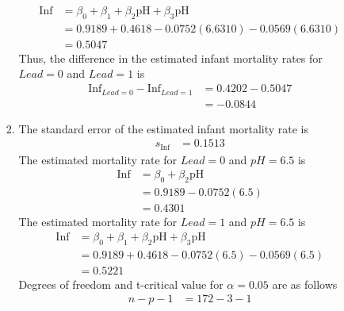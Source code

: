 \documentclass{uofa-eng-assignment}
\begin{document}
\begin{enumerate}
\begin{enumerate}
\begin{enumerate}
\begin{align*}
                              \text{Inf} & = \beta_0 + \beta_1 + \beta_2\text{pH} + \beta_3\text{pH} \\
                                         & = 0.9189 + 0.4618 - 0.0752(6.6310) - 0.0569(6.6310)       \\
                                         & = 0.5047
                          \end{align*}
                          Thus, the difference in the estimated infant mortality rates for $Lead = 0$ and $Lead = 1$ is
                          \begin{align*}
                              \text{Inf}_{Lead = 0} - \text{Inf}_{Lead = 1} & = 0.4202 - 0.5047 \\
                                                                            & = -0.0844
                          \end{align*}
                    \item
                          The standard error of the estimated infant mortality rate is
                          \begin{align*}
                              s_{\text{Inf}} & = 0.1513
                          \end{align*}
                          The estimated mortality rate for $Lead = 0$ and $pH = 6.5$ is
                          \begin{align*}
                              \text{Inf} & = \beta_0 + \beta_2\text{pH} \\
                                         & = 0.9189 - 0.0752(6.5)       \\
                                         & = 0.4301
                          \end{align*}
                          The estimated mortality rate for $Lead = 1$ and $pH = 6.5$ is
                          \begin{align*}
                              \text{Inf} & = \beta_0 + \beta_1 + \beta_2\text{pH} + \beta_3\text{pH} \\
                                         & = 0.9189 + 0.4618 - 0.0752(6.5) - 0.0569(6.5)             \\
                                         & = 0.5221
                          \end{align*}
                          Degrees of freedom and t-critical value for $\alpha = 0.05$ are as follows
                          \begin{align*}
                              n - p - 1          & = 172 - 3 - 1    \\

\end{align*}
\end{enumerate}
\end{enumerate}
\end{enumerate}
\end{document}
